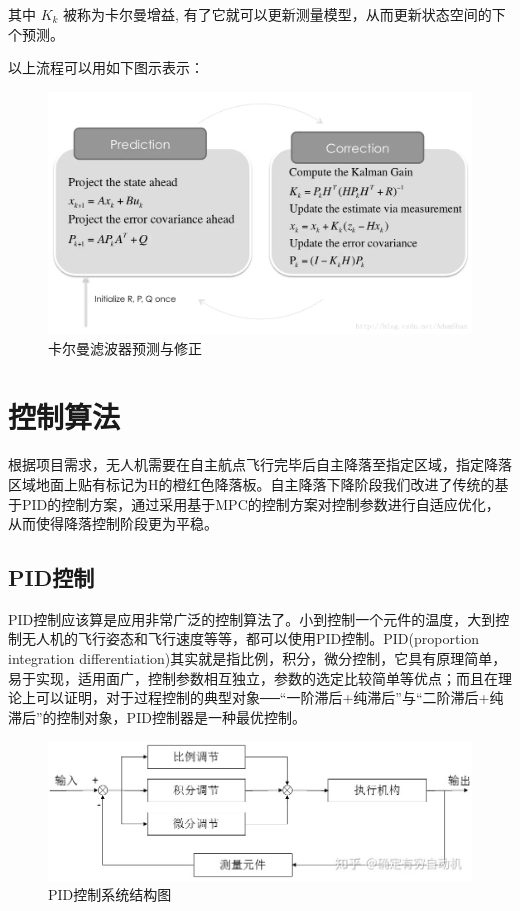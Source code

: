其中 $K_{k}$ 被称为卡尔曼增益, 有了它就可以更新测量模型，从而更新状态空间的下个预测。

以上流程可以用如下图示表示：

\begin{figure}[ht]
  \centering
  \includegraphics[width=0.8\linewidth]{./Figure/Kalman_Prediction_and_Correction.png}
  \caption{卡尔曼滤波器预测与修正}\label{Fig:xd1}
\end{figure}

\section{控制算法}

根据项目需求，无人机需要在自主航点飞行完毕后自主降落至指定区域，指定降落区域地面上贴有标记为H的橙红色降落板。自主降落下降阶段我们改进了传统的基于PID的控制方案，通过采用基于MPC的控制方案对控制参数进行自适应优化，从而使得降落控制阶段更为平稳。

\subsection{PID控制}

PID控制应该算是应用非常广泛的控制算法了。小到控制一个元件的温度，大到控制无人机的飞行姿态和飞行速度等等，都可以使用PID控制。PID(proportion integration differentiation)其实就是指比例，积分，微分控制，它具有原理简单，易于实现，适用面广，控制参数相互独立，参数的选定比较简单等优点；而且在理论上可以证明，对于过程控制的典型对象──“一阶滞后+纯滞后”与“二阶滞后+纯滞后”的控制对象，PID控制器是一种最优控制。

\begin{figure}[ht]
  \centering
  \includegraphics[width=0.8\linewidth]{./Figure/PID_Graph.jpg}
  \caption{PID控制系统结构图}\label{Fig:xd1}
\end{figure}

